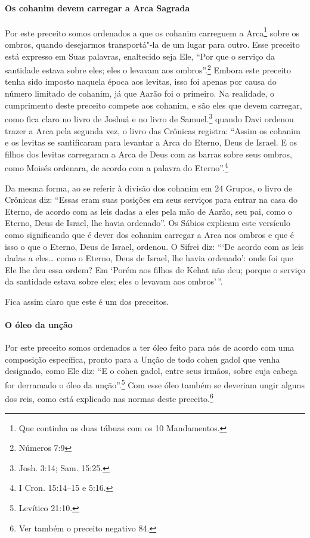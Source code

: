 \begin{multicols}{2}
\paragraph{Os cohanim\starr{} devem carregar a Arca Sagrada}


Por este preceito somos ordenados a que os cohanim\starr{} carreguem
a Arca\footnote{Que continha as duas tábuas com os 10 Mandamentos.} sobre os ombros, quando desejarmos
transportá"-la de um lugar para
outro. Esse preceito está expresso em Suas palavras, enaltecido seja
Ele, ``Por que o serviço da santidade estava sobre eles; eles o levavam aos
ombros''.\footnote{Números 7:9} Embora este preceito tenha sido imposto naquela
época aos levitas\starr, isso foi apenas por causa do número limitado de
cohanim\starr, já que Aarão
foi o primeiro. Na realidade, o cumprimento deste preceito compete aos
cohanim\starr, e são eles que devem carregar, como fica claro no livro de
Joshuá e no livro de Samuel.\footnote{Josh. 3:14;  Sam. 15:25.} quando Davi ordenou trazer a
Arca pela segunda vez, o livro das Crônicas registra: ``Assim os cohanim\starr{} e os levitas\starr{} se santificaram
para levantar a Arca do Eterno, Deus de Israel. E os filhos dos levitas\starr{}
carregaram a Arca de Deus com as barras sobre seus ombros, como Moisés
ordenara, de acordo com a palavra do Eterno''.\footnote{I Cron. 15:14--15 e 5:16.}


Da mesma forma, ao se referir à divisão dos cohanim\starr{} em 24 Grupos, o
livro de Crônicas diz: ``Essas eram suas posições em seus serviços para
entrar na casa do Eterno, de acordo com as leis dadas a eles pela mão de
Aarão, seu pai, como o Eterno, Deus de Israel, lhe havia ordenado''. Os
Sábios explicam este versículo como significando que é dever dos
cohanim\starr{} carregar a Arca nos ombros e que é isso o que o Eterno, Deus
de Israel, ordenou. O Sifrei\starr{} diz: ```De acordo com as leis dadas a eles\ldots{}
como o Eterno, Deus de Israel, lhe havia ordenado': onde foi que
Ele lhe deu essa ordem? Em `Porém aos filhos de Kehat\starr{} não deu; porque o
serviço da santidade estava sobre eles; eles o levavam aos ombros'\,''.

Fica assim claro que este é um dos preceitos.

\paragraph{O óleo da unção}

Por este preceito somos ordenados a ter óleo feito para nós de acordo
com uma composição específica, pronto para a Unção de todo cohen gadol\starr{} que venha designado, como Ele diz: ``E o cohen gadol\starr, entre seus
irmãos, sobre cuja cabeça for derramado o óleo da unção''.\footnote{Levítico
21:10.} Com esse óleo também se deveriam ungir alguns dos reis, como
está explicado nas normas deste preceito.\footnote{Ver também o preceito negativo 84.}


\end{multicols}
